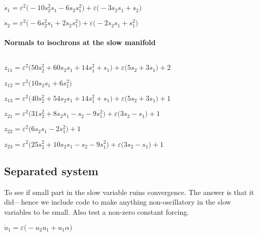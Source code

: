 \documentclass[11pt,a5paper]{article}
\def\eps{\varepsilon}
\begin{document}
\begin{math}
\dot s_{1}=\varepsilon ^{2} \big(-10 s_{2}^{2} s_{1}-6 s_{2} s_{1}^{2}
\big)+\varepsilon  \big(-3 s_{2} s_{1}+s_{2}\big)
\end{math}\par

\begin{math}
\dot s_{2}=\varepsilon ^{2} \big(-6 s_{2}^{2} s_{1}+2 s_{2} s_{1}^{2}
\big)+\varepsilon  \big(-2 s_{2} s_{1}+s_{1}^{2}\big)
\end{math}

\paragraph{Normals to isochrons at the slow manifold}
\(
\)\par

\(z_{11}=\eps^{2} \big(50 s_{2}^{2}+60 s_{2} s_{1}+14 s_{1}^{2}+s_{1}\big)
+\eps \big(5 s_{2}+3 s_{1}\big)+2
\)\par

\(z_{12}=\eps^{2} \big(10 s_{2} s_{1}+6 s_{1}^{2}\big)
\)\par

\(z_{13}=\eps^{2} \big(40 s_{2}^{2}+54 s_{2} s_{1}+14 s_{1}^{2}+s_{1}\big)
+\eps \big(5 s_{2}+3 s_{1}\big)+1
\)\par

\(z_{21}=\eps^{2} \big(31 s_{2}^{2}+8 s_{2} s_{1}-s_{2}-9 s_{1}^{2}\big)+
\eps \big(3 s_{2}-s_{1}\big)+1
\)\par

\(z_{22}=\eps^{2} \big(6 s_{2} s_{1}-2 s_{1}^{2}\big)+1
\)\par

\(z_{23}=\eps^{2} \big(25 s_{2}^{2}+10 s_{2} s_{1}-s_{2}-9 s_{1}^{2}\big)+
\eps \big(3 s_{2}-s_{1}\big)+1
\)\par





\subsection{Separated system}
To see if small part in the slow variable ruins convergence.
The answer is that it did---hence we include code to make anything non-oscillatory in the slow variables to be small.
Also test a non-zero constant forcing.

\begin{math}
\dot u_{1}=\varepsilon  \big(-u_{2} u_{1}+u_{1} \alpha\big)
\end{math}\par
\end{document}
